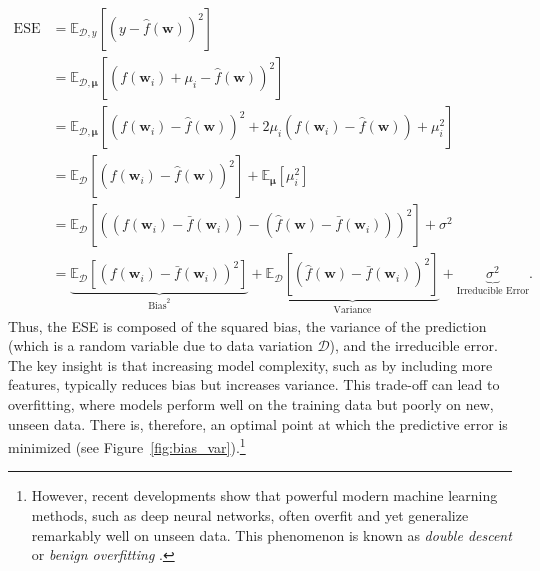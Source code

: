 \begin{align*}
	\text{ESE} &= \mathbb{E}_{\mathcal{D},y} \left[ (y - \hat{f}(\mathbf{w}))^2 \right] \\
	&= \mathbb{E}_{\mathcal{D},\boldsymbol{\mu}} \left[ \left(f(\mathbf{w}_i) + \mu_i - \hat{f}(\mathbf{w})\right)^2 \right] \\
	&= \mathbb{E}_{\mathcal{D},\boldsymbol{\mu}} \left[ (f(\mathbf{w}_i) - \hat{f}(\mathbf{w}))^2 + 2\mu_i(f(\mathbf{w}_i) - \hat{f}(\mathbf{w})) + \mu_i^2 \right] \\
	&= \mathbb{E}_{\mathcal{D}} \left[ (f(\mathbf{w}_i) - \hat{f}(\mathbf{w}))^2 \right] + \mathbb{E}_{\boldsymbol{\mu}} \left[ \mu_i^2 \right] \\
	&= \mathbb{E}_{\mathcal{D}} \left[ \left((f(\mathbf{w}_i) - \bar{f}(\mathbf{w}_i)) - (\hat{f}(\mathbf{w}) - \bar{f}(\mathbf{w}_i)) \right)^2 \right] + \sigma^2 \\
	&= \underbrace{\mathbb{E}_{\mathcal{D}} \left[ (f(\mathbf{w}_i) - \bar{f}(\mathbf{w}_i))^2 \right]}_{\text{Bias}^2} + \underbrace{\mathbb{E}_{\mathcal{D}} \left[ (\hat{f}(\mathbf{w}) - \bar{f}(\mathbf{w}_i))^2 \right]}_{\text{Variance}} + \underbrace{\sigma^2}_{\text{Irreducible Error}}.
\end{align*}
Thus, the ESE is composed of the squared bias, the variance of the prediction (which is a random variable due to data variation $\mathcal{D}$), and the irreducible error. The key insight is that increasing model complexity, such as by including more features, typically reduces bias but increases variance. This trade-off can lead to overfitting, where models perform well on the training data but poorly on new, unseen data. There is, therefore, an optimal point at which the predictive error is minimized (see Figure~\ref{fig:bias_var}).\footnote{However, recent developments show that powerful modern machine learning methods, such as deep neural networks, often overfit and yet generalize remarkably well on unseen data. This phenomenon is known as \textit{double descent} or \textit{benign overfitting} \cite{belkin2019reconciling, bartlett2020benign, hastie2022surprises}.}

